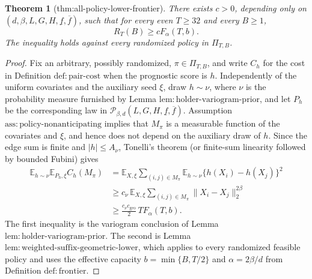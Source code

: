\documentclass{article}
\newtheorem{theorem}{Theorem}
\begin{document}
\begin{theorem}[thm:all-policy-lower-frontier]\label{thm:all-policy-lower-frontier}
There exists \(c>0\), depending only on \((d,\beta,L,G,H,\underline f,\overline f)\), such that for every even \(T\ge32\) and every \(B\ge1\), \[R_T(B)\ge cF_\alpha(T,b).\] The inequality holds against every randomized policy in \(\Pi_{T,B}\).
\end{theorem}
\begin{proof}
Fix an arbitrary, possibly randomized, \(\pi\in\Pi_{T,B}\), and write \(C_h\) for the cost in Definition \(\mathrm{def:pair\text{-}cost}\) when the prognostic score is \(h\).  Independently of the uniform covariates and the auxiliary seed \(\xi\), draw \(h\sim\nu\), where \(\nu\) is the probability measure furnished by Lemma \(\mathrm{lem:holder\text{-}variogram\text{-}prior}\), and let \(P_h\) be the corresponding law in \(\mathcal P_{\beta,d}(L,G,H,\underline f,\overline f)\).  Assumption \(\mathrm{ass:policy\text{-}nonanticipating}\) implies that \(M_\pi\) is a measurable function of the covariates and \(\xi\), and hence does not depend on the auxiliary draw of \(h\).  Since the edge sum is finite and \(|h|\le A_\nu\), Tonelli's theorem (or finite-sum linearity followed by bounded Fubini) gives
\[
\begin{aligned}
\mathbb E_{h\sim\nu}\mathbb E_{P_h,\xi} C_h(M_\pi)
&=\mathbb E_{X,\xi}\sum_{(i,j)\in M_\pi}
  \mathbb E_{h\sim\nu}\{h(X_i)-h(X_j)\}^2 \\
&\ge c_\nu\,\mathbb E_{X,\xi}\sum_{(i,j)\in M_\pi}
  \|X_i-X_j\|_2^{2\beta} \\
&\ge \frac{c_\nu c_{\mathrm{geo}}}{2}\,T F_\alpha(T,b).
\end{aligned}
\tag{4}
\]
The first inequality is the variogram conclusion of Lemma \(\mathrm{lem:holder\text{-}variogram\text{-}prior}\).  The second is Lemma \(\mathrm{lem:weighted\text{-}suffix\text{-}geometric\text{-}lower}\), which applies to every randomized feasible policy and uses the effective capacity \(b=\min\{B,T/2\}\) and \(\alpha=2\beta/d\) from Definition \(\mathrm{def:frontier}\).


\end{proof}
\end{document}
